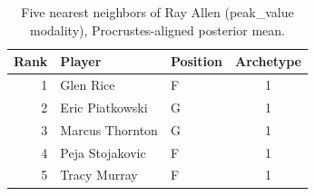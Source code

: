 \begin{table}[htbp]
  \centering\small
  \begin{tabular}{rllc}
    \toprule
    Rank & Player & Position & Archetype \\
    \midrule
    1 & Glen Rice & F & 1 \\
    2 & Eric Piatkowski & G & 1 \\
    3 & Marcus Thornton & G & 1 \\
    4 & Peja Stojakovic & F & 1 \\
    5 & Tracy Murray & F & 1 \\
    \bottomrule
  \end{tabular}
  \caption{Five nearest neighbors of Ray Allen (peak_value modality), Procrustes-aligned posterior mean.}
  \label{tab:Ray_Allen_neighbors_peak_value}
\end{table}

